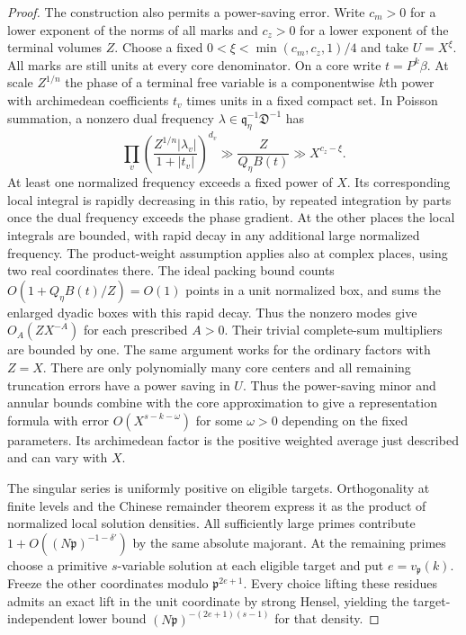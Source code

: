 \documentclass[11pt,letterpaper]{article}
\theoremstyle{definition}
\numberwithin{equation}{section}
\begin{document}
\begin{proof}
The construction also permits a power-saving error. Write $c_m>0$ for
a lower exponent of the norms of all marks and $c_z>0$ for a lower
exponent of the terminal volumes $Z$. Choose a fixed
$0<\xi<\min(c_m,c_z,1)/4$ and take $U=X^\xi$. All marks are still
units at every core denominator. On a core write $t=P^k\beta$.
At scale $Z^{1/n}$ the phase of a terminal free variable is a
componentwise $k$th power with archimedean coefficients $t_v$ times
units in a fixed compact set. In Poisson summation, a nonzero dual
frequency $\lambda\in\mathfrak q_\eta^{-1}\mathfrak D^{-1}$ has
\[
 \prod_v\left(\frac{Z^{1/n}|\lambda_v|}{1+|t_v|}\right)^{d_v}
                  \gg\frac{Z}{Q_\eta B(t)}\gg X^{c_z-\xi}.
\]
At least one normalized frequency exceeds a fixed power of $X$.
Its corresponding local integral is rapidly decreasing in this
ratio, by repeated integration by parts once the dual frequency
exceeds the phase gradient. At the other places the local integrals
are bounded, with rapid decay in any additional large normalized
frequency. The product-weight assumption applies also at complex
places, using two real coordinates there. The ideal packing bound
counts $O(1+Q_\eta B(t)/Z)=O(1)$ points in a unit normalized box,
and sums the enlarged dyadic boxes with this rapid decay. Thus the
nonzero modes give $O_A(ZX^{-A})$ for each prescribed $A>0$.
Their trivial complete-sum multipliers are bounded by one.
The same argument works for the ordinary factors with $Z=X$.
There are only polynomially many core centers and all remaining
truncation errors have a power saving in $U$. Thus the power-saving
minor and annular bounds combine with the core approximation to give
a representation formula with error $O(X^{s-k-\omega})$ for some
$\omega>0$ depending on the fixed parameters. Its archimedean factor
is the positive weighted average just described and can vary with $X$.

The singular series is uniformly positive on eligible targets.
Orthogonality at finite levels and the Chinese remainder theorem
express it as the product of normalized local solution densities.
All sufficiently large primes contribute $1+O((N\mathfrak p)^{-1-\delta'})$
by the same absolute majorant. At the remaining primes choose a
primitive $s$-variable solution at each eligible target and put
$e=v_{\mathfrak p}(k)$. Freeze the other coordinates modulo
$\mathfrak p^{2e+1}$. Every choice lifting these residues admits
an exact lift in the unit coordinate by strong Hensel, yielding the
target-independent lower bound
$(N\mathfrak p)^{-(2e+1)(s-1)}$ for that density.


\end{proof}
\end{document}
